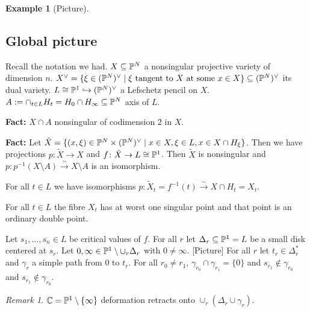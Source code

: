 \documentclass[A4paper, british, reqno]{amsart}
\theoremstyle{darkgreentheorem}
\theoremstyle{darkbluedefinition}
\theoremstyle{darkredexample}
\newtheorem{exa}[thm]{Example}
\theoremstyle{remark}
\newtheorem{rem}[thm]{Remark}
\newcommand{\1}{\mathbbm{1}}
\newcommand{\dual}{^{\vee}}
\newcommand{\tms}{\times}
\newcommand{\sub}{\subseteq}
\newcommand{\mono}{\hookrightarrow}
\begin{document}
\begin{exa}
    [Picture]
\end{exa}

\subsection{Global picture}

Recall the notation we had.
$X\sub \P^{N}$ a nonsingular projective variety of dimension $n$.
$X\dual=\{\xi\in (\P^{N})\dual\mid \xi \text{ tangent to }X\text{ at some }x\in X\}\sub(\P^{N})\dual$ its dual variety.
$L\cong \P^{1}\mono (\P^{N})\dual$ a Lefschetz pencil on $X$.
$A:=\cap_{t\in L}H_{t}=H_{0}\cap H_{\infty} \sub \P^{N}$ axis of $L$.

\textbf{Fact:}
$X\cap A$ nonsingular of codimension $2$ in $X$.

\textbf{Fact:}
Let $\tilde{X}=\{(x,\xi)\in \P^{N}\tms (\P^{N})\dual \mid x\in X, \xi\in L, x\in X\cap H_{\xi} \}$.
Then we have projections $p\colon \tilde{X}\to X$ and $f\colon \tilde{X}\to L\cong \P^{1}$.
Then $\tilde{X}$ is nonsingular and $p\colon p^{-1}(X\setminus A)\xrightarrow{\sim}X\setminus A$ is an isomorphism.

For all $t\in L$ we have isomorphisms $p\colon \tilde{X}_{t}=f^{-1}(t)\xrightarrow{\sim}X\cap H_{t}=X_{t}$.

For all $t\in L$ the fibre $X_{t}$ has at worst one singular point and that point is an ordinary double point.

Let $s_{1},\ldots,s_{n}\in L$ be critical values of $f$.
For all $r$ let $\Delta_{r}\sub \P^{1}=L$ be a small disk centered at $s_{r}$.
Let $0,\infty\in \P^{1}\setminus \cup_{r}\Delta_{r}$ with $0\neq \infty$.
[Picture]
For all $r$ let $t_{r}\in \Delta_{r}^{*}$ and $\gamma_{r}$ a simple path from $0$ to $t_{r}$.
For all $r_{0}\neq r_{1}$, $\gamma_{r_{0}}\cap \gamma_{r_{1}}=\{0\}$ and $s_{r_{1}}\not\in\gamma_{r_{0}}$ and $s_{r_{1}}\not\in \gamma_{r_{0}}$.

\begin{rem}
    $\C=\P^{1}\setminus \{\infty\}$ deformation retracts onto $\cup_{r}(\Delta_{r}\cup \gamma_{r})$.
\end{rem}
\end{document}
